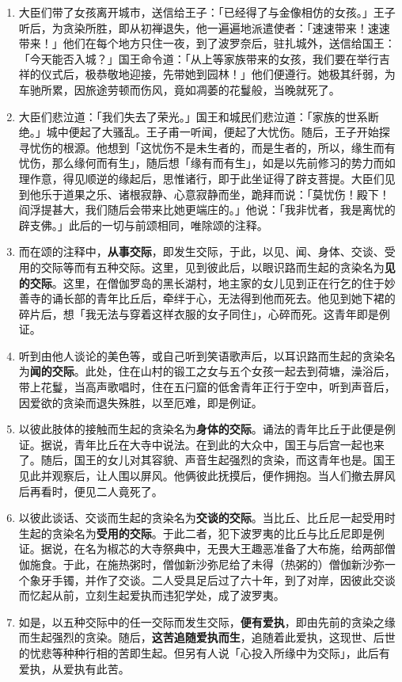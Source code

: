 \begin{enumerate}
\item 大臣们带了女孩离开城市，送信给王子：「已经得了与金像相仿的女孩。」王子听后，为贪染所胜，即从初禅退失，他一遍遍地派遣使者：「速速带来！速速带来！」他们在每个地方只住一夜，到了波罗奈后，驻扎城外，送信给国王：「今天能否入城？」国王命令道：「从上等家族带来的女孩，我们要在举行吉祥的仪式后，极恭敬地迎接，先带她到园林！」他们便遵行。她极其纤弱，为车驰所累，因旅途劳顿而伤风，竟如凋萎的花鬘般，当晚就死了。
\item 大臣们悲泣道：「我们失去了荣光。」国王和城民们悲泣道：「家族的世系断绝。」城中便起了大骚乱。王子甫一听闻，便起了大忧伤。随后，王子开始探寻忧伤的根源。他想到「这忧伤不是未生者的，而是生者的，所以，缘生而有忧伤，那么缘何而有生」，随后想「缘有而有生」，如是以先前修习的势力而如理作意，得见顺逆的缘起后，思惟诸行，即于此坐证得了辟支菩提。大臣们见到他乐于道果之乐、诸根寂静、心意寂静而坐，跪拜而说：「莫忧伤！殿下！阎浮提甚大，我们随后会带来比她更端庄的。」他说：「我非忧者，我是离忧的辟支佛。」此后的一切与前颂相同，唯除颂的注释。
\item 而在颂的注释中，\textbf{从事交际}，即发生交际，于此，以见、闻、身体、交谈、受用的交际等而有五种交际。这里，见到彼此后，以眼识路而生起的贪染名为\textbf{见的交际}。这里，在僧伽罗岛的黑长湖村，地主家的女儿见到正在行乞的住于妙善寺的诵长部的青年比丘后，牵绊于心，无法得到他而死去。他见到她下裙的碎片后，想「我无法与穿着这样衣服的女子同住」，心碎而死。这青年即是例证。
\item 听到由他人谈论的美色等，或自己听到笑语歌声后，以耳识路而生起的贪染名为\textbf{闻的交际}。此处，住在山村的锻工之女与五个女孩一起去到荷塘，澡浴后，带上花鬘，当高声歌唱时，住在五闩窟的低舍青年正行于空中，听到声音后，因爱欲的贪染而退失殊胜，以至厄难，即是例证。
\item 以彼此肢体的接触而生起的贪染名为\textbf{身体的交际}。诵法的青年比丘于此便是例证。据说，青年比丘在大寺中说法。在到此的大众中，国王与后宫一起也来了。随后，国王的女儿对其容貌、声音生起强烈的贪染，而这青年也是。国王见此并观察后，让人围以屏风。他俩彼此抚摸后，便作拥抱。当人们撤去屏风后再看时，便见二人竟死了。
\item 以彼此谈话、交谈而生起的贪染名为\textbf{交谈的交际}。当比丘、比丘尼一起受用时生起的贪染名为\textbf{受用的交际}。于此二者，犯下波罗夷的比丘与比丘尼即是例证。据说，在名为椒芯的大寺祭典中，无畏大王趣恶准备了大布施，给两部僧伽施食。于此，在施热粥时，僧伽新沙弥尼给了未得（热粥的）僧伽新沙弥一个象牙手镯，并作了交谈。二人受具足后过了六十年，到了对岸，因彼此交谈而忆起从前，立刻生起爱执而违犯学处，成了波罗夷。
\item 如是，以五种交际中的任一交际而发生交际，\textbf{便有爱执}，即由先前的贪染之缘而生起强烈的贪染。随后，\textbf{这苦追随爱执而生}，追随着此爱执，这现世、后世的忧悲等种种行相的苦即生起。但另有人说「心投入所缘中为交际」，此后有爱执，从爱执有此苦。

\end{enumerate}
